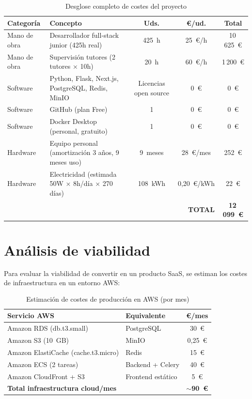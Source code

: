 \begin{table}[htbp]
  \centering
  \caption{Desglose completo de costes del proyecto}
  \begin{tabularx}{\textwidth}{l X c c c}
    \toprule
    \textbf{Categoría} & \textbf{Concepto} &
      \textbf{Uds.} & \textbf{€/ud.} & \textbf{Total} \\
    \midrule
    Mano de obra & Desarrollador full-stack junior (425h real) &
      425~h & 25~€/h & 10\,625~€ \\
    Mano de obra & Supervisión tutores (2 tutores × 10h) &
      20~h & 60~€/h & 1\,200~€ \\
    \midrule
    Software & Python, Flask, Next.js, PostgreSQL, Redis, MinIO &
      Licencias open source & 0~€ & 0~€ \\
    Software & GitHub (plan Free) & 1 & 0~€ & 0~€ \\
    Software & Docker Desktop (personal, gratuito) & 1 & 0~€ & 0~€ \\
    \midrule
    Hardware & Equipo personal (amortización 3 años, 9 meses uso) &
      9~meses & 28~€/mes & 252~€ \\
    Hardware & Electricidad (estimada 50W × 8h/día × 270 días) &
      108~kWh & 0,20~€/kWh & 22~€ \\
    \midrule
    \multicolumn{4}{r}{\textbf{TOTAL}} & \textbf{12\,099~€} \\
    \bottomrule
  \end{tabularx}
\end{table}

\section*{Análisis de viabilidad}

Para evaluar la viabilidad de convertir \dataqual en un producto SaaS, se
estiman los costes de infraestructura en un entorno \ac{AWS}:

\begin{table}[htbp]
  \centering
  \caption{Estimación de costes de producción en AWS (por mes)}
  \begin{tabularx}{\textwidth}{l X c}
    \toprule
    \textbf{Servicio AWS} & \textbf{Equivalente} & \textbf{€/mes} \\
    \midrule
    Amazon \ac{RDS} (db.t3.small) & PostgreSQL & 30~€ \\
    Amazon S3 (10~GB) & MinIO & 0,25~€ \\
    Amazon ElastiCache (cache.t3.micro) & Redis & 15~€ \\
    Amazon \ac{ECS} (2 tareas) & Backend + Celery & 40~€ \\
    Amazon CloudFront + S3 & Frontend estático & 5~€ \\
    \midrule
    \multicolumn{2}{l}{\textbf{Total infraestructura cloud/mes}} & \textbf{\(\sim\)90~€} \\
    \bottomrule
  \end{tabularx}
\end{table}

